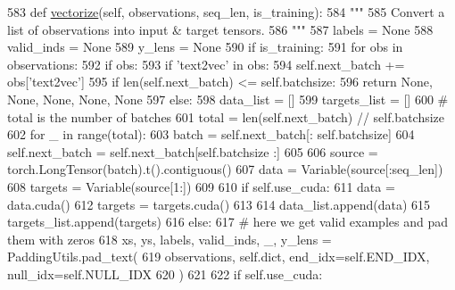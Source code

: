 \begin{DoxyCode}
583     \textcolor{keyword}{def }\hyperlink{namespaceparlai_1_1agents_1_1drqa_1_1utils_a5c76cc39e3014c7bcf9199d566dbdc0f}{vectorize}(self, observations, seq\_len, is\_training):
584         \textcolor{stringliteral}{"""}
585 \textcolor{stringliteral}{        Convert a list of observations into input & target tensors.}
586 \textcolor{stringliteral}{        """}
587         labels = \textcolor{keywordtype}{None}
588         valid\_inds = \textcolor{keywordtype}{None}
589         y\_lens = \textcolor{keywordtype}{None}
590         \textcolor{keywordflow}{if} is\_training:
591             \textcolor{keywordflow}{for} obs \textcolor{keywordflow}{in} observations:
592                 \textcolor{keywordflow}{if} obs:
593                     \textcolor{keywordflow}{if} \textcolor{stringliteral}{'text2vec'} \textcolor{keywordflow}{in} obs:
594                         self.next\_batch += obs[\textcolor{stringliteral}{'text2vec'}]
595             \textcolor{keywordflow}{if} len(self.next\_batch) <= self.batchsize:
596                 \textcolor{keywordflow}{return} \textcolor{keywordtype}{None}, \textcolor{keywordtype}{None}, \textcolor{keywordtype}{None}, \textcolor{keywordtype}{None}, \textcolor{keywordtype}{None}
597             \textcolor{keywordflow}{else}:
598                 data\_list = []
599                 targets\_list = []
600                 \textcolor{comment}{# total is the number of batches}
601                 total = len(self.next\_batch) // self.batchsize
602                 \textcolor{keywordflow}{for} \_ \textcolor{keywordflow}{in} range(total):
603                     batch = self.next\_batch[: self.batchsize]
604                     self.next\_batch = self.next\_batch[self.batchsize :]
605 
606                     source = torch.LongTensor(batch).t().contiguous()
607                     data = Variable(source[:seq\_len])
608                     targets = Variable(source[1:])
609 
610                     \textcolor{keywordflow}{if} self.use\_cuda:
611                         data = data.cuda()
612                         targets = targets.cuda()
613 
614                     data\_list.append(data)
615                     targets\_list.append(targets)
616         \textcolor{keywordflow}{else}:
617             \textcolor{comment}{# here we get valid examples and pad them with zeros}
618             xs, ys, labels, valid\_inds, \_, y\_lens = PaddingUtils.pad\_text(
619                 observations, self.dict, end\_idx=self.END\_IDX, null\_idx=self.NULL\_IDX
620             )
621 
622             \textcolor{keywordflow}{if} self.use\_cuda:

\end{DoxyCode}
